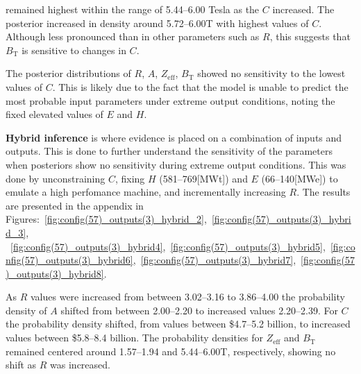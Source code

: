 \documentclass[journal]{IEEEtran}
\begin{document}
 remained highest within the range of 5.44--6.00 Tesla as the $C$ increased. The posterior increased in density around 5.72--6.00T with highest values of $C$. Although less pronounced than in other parameters such as $R$, this suggests that $B_{\text{T}}$ is sensitive to changes in $C$.

The posterior distributions of $R$, $A$, $Z_{\text{eff}}$, $B_{\text{T}}$ showed no sensitivity to the lowest values of $C$. This is likely due to the fact that the model is unable to predict the most probable input parameters under extreme output conditions, noting the fixed elevated values of $E$ and $H$. 

\textbf{Hybrid inference} is where evidence is placed on a combination of inputs and outputs. This is done to further understand the sensitivity of the parameters when posteriors show no sensitivity during extreme output conditions. This was done by unconstraining $C$, fixing $H$ (581--769[MWt]) and $E$ (66--140[MWe]) to emulate a high perfomance machine, and incrementally increasing $R$. The results are presented in the appendix in Figures:~\ref{fig:config(57)_outputs(3)_hybrid_2},~\ref{fig:config(57)_outputs(3)_hybrid_3},
~\ref{fig:config(57)_outputs(3)_hybrid4},~\ref{fig:config(57)_outputs(3)_hybrid5},~\ref{fig:config(57)_outputs(3)_hybrid6},~\ref{fig:config(57)_outputs(3)_hybrid7},~\ref{fig:config(57)_outputs(3)_hybrid8}.

As $R$ values were increased from between 3.02--3.16 to 3.86--4.00 the probability density of $A$ shifted from between 2.00--2.20 to increased values 2.20--2.39. For $C$ the probability density shifted, from values between \$4.7--5.2 billion, to increased values between \$5.8--8.4 billion. The probability densities for $Z_{\text{eff}}$ and $B_{\text{T}}$ remained centered around 1.57--1.94 and 5.44--6.00T, respectively, showing no shift as $R$ was increased. 


\end{document}
